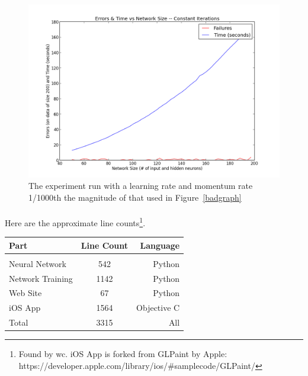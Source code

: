 \documentclass{article}
\begin{document}
    \begin{figure}
        \centering
        \includegraphics[scale=0.5]{images/good_learning.png}
        \caption{The experiment run with a learning rate and momentum rate 
            1/1000th the magnitude of that used in Figure~\ref{badgraph}}
        \label{goodgraph}
    \end{figure}

    \paragraph{}Here are the approximate line 
    counts\footnote{Found by wc. iOS App is forked from GLPaint by Apple: 
    https://developer.apple.com/library/ios/\#samplecode/GLPaint/}. \\

    \begin{tabular}{ l c r }
        Part & Line Count & Language \\
        \hline \\
        Neural Network & 542 & Python \\
        Network Training & 1142 & Python \\
        Web Site & 67 & Python \\
        iOS App & 1564 & Objective C \\
        Total & 3315 & All \\
    \end{tabular}
\end{document}
